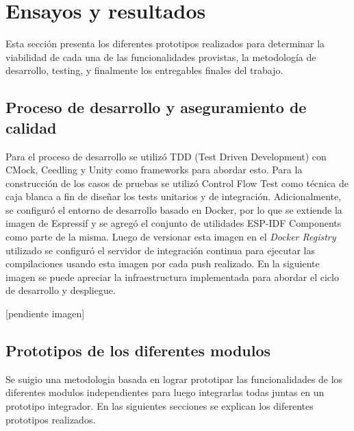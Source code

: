 
\chapter{Ensayos y resultados} %

\label{Chapter4} %

Esta sección presenta los diferentes prototipos realizados para determinar la viabilidad de cada una de las funcionalidades provistas, la metodología de desarrollo, testing, y finalmente los entregables finales del trabajo.

\section{Proceso de desarrollo y aseguramiento de calidad}
\label{sec:pruebasHW}

Para el proceso de desarrollo se utilizó TDD (Test Driven Development) con CMock, Ceedling y Unity como frameworks para abordar esto. Para la construcción de los casos de pruebas se utilizó Control Flow Test como técnica de caja blanca a fin de diseñar los tests unitarios y de integración. 
Adicionalmente, se configuró el entorno de desarrollo basado en Docker, por lo que se extiende la imagen de Espressif y se agregó el conjunto de utilidades ESP-IDF Components como parte de la misma. Luego de versionar esta imagen en el \textit{Docker Registry} utilizado se configuró el servidor de integración continua para ejecutar las compilaciones usando esta imagen por cada push realizado.
En la siguiente imagen se puede apreciar la infraestructura implementada para abordar el ciclo de desarrollo y despliegue. 


[pendiente imagen]

\section{Prototipos de los diferentes modulos}
\label{sec:pruebasHW}

Se suigio una metodologia basada en lograr prototipar las funcionalidades de los diferentes modulos independientes para luego integrarlas todas juntas en un prototipo integrador. En las siguientes secciones se explican los diferentes prototipos realizados.

